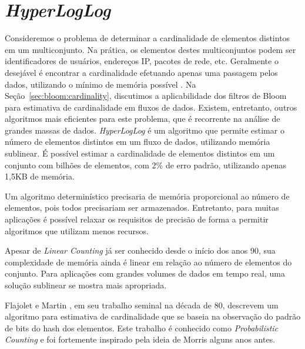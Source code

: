 
\section{\emph{HyperLogLog}}\label{sec:hyperloglog}

Consideremos o problema de determinar a cardinalidade de elementos distintos em um multiconjunto. Na prática, os elementos destes multiconjuntos podem ser identificadores de usuários, endereços IP, pacotes de rede, etc. Geralmente o desejável é encontrar a cardinalidade efetuando apenas uma passagem pelos dados, utilizando o mínimo de memória possível \cite{metwally2008go,clifford2012statistical}. Na Seção~\ref{sec:bloom:cardinality}, discutimos a aplicabilidade dos filtros de Bloom para estimativa de cardinalidade em fluxos de dados. Existem, entretanto, outros algoritmos mais eficientes para este problema, que é recorrente na análise de grandes massas de dados. \emph{HyperLogLog} é um algoritmo que permite estimar o número de elementos distintos em um fluxo de dados, utilizando memória sublinear. É possível estimar a cardinalidade de elementos distintos em um conjunto com bilhões de elementos, com 2\% de erro padrão, utilizando apenas 1,5KB de memória.

Um algoritmo determinístico precisaria de memória proporcional ao número de elementos, pois todos precisariam ser armazenados. Entretanto, para muitas aplicações é possível relaxar os requisitos de precisão de forma a permitir algoritmos que utilizam menos recursos.

Apesar de \emph{Linear Counting} \cite{whang1990linear} já ser conhecido desde o início dos anos 90, sua complexidade de memória ainda é linear em relação ao número de elementos do conjunto. Para aplicações com grandes volumes de dados em tempo real, uma solução sublinear se mostra mais apropriada.

Flajolet e Martin \cite{flajolet1985probabilistic}, em seu trabalho seminal na década de 80, descrevem um algoritmo para estimativa de cardinalidade que se baseia na observação do padrão de bits do hash dos elementos. Este trabalho é conhecido como \emph{Probabilistic Counting} e foi fortemente inspirado pela ideia de Morris \cite{morris1978counting} alguns anos antes. 

